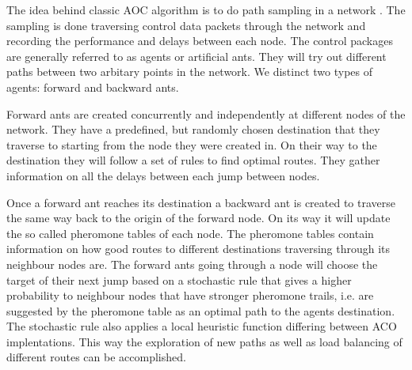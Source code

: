 \documentclass{IWORK2014}
\begin{document}
The idea behind classic AOC algorithm is to do path sampling in a network \cite{di2004ant, di2008theory}. The sampling is done traversing control data packets through the network and recording the performance and delays between each node. The control packages are generally referred to as agents or artificial ants. They will try out different paths between two arbitary points in the network. We distinct two types of agents: forward and backward ants.

Forward ants are created concurrently and independently at different nodes of the network. They have a predefined, but randomly chosen destination that they traverse to starting from the node they were created in. On their way to the destination they will follow a set of rules to find optimal routes. They gather information on all the delays between each jump between nodes.

Once a forward ant reaches its destination a backward ant is created to traverse the same way back to the origin of the forward node. On its way it will update the so called pheromone tables of each node. The pheromone tables contain information on how good routes to different destinations traversing through its neighbour nodes are. The forward ants going through a node will choose the target of their next jump based on a stochastic rule that gives a higher probability to neighbour nodes that have stronger pheromone trails, i.e. are suggested by the pheromone table as an optimal path to the agents destination. The stochastic rule also applies a local heuristic function differing between ACO implentations. This way the exploration of new paths as well as load balancing of different routes can be accomplished.



\end{document}

